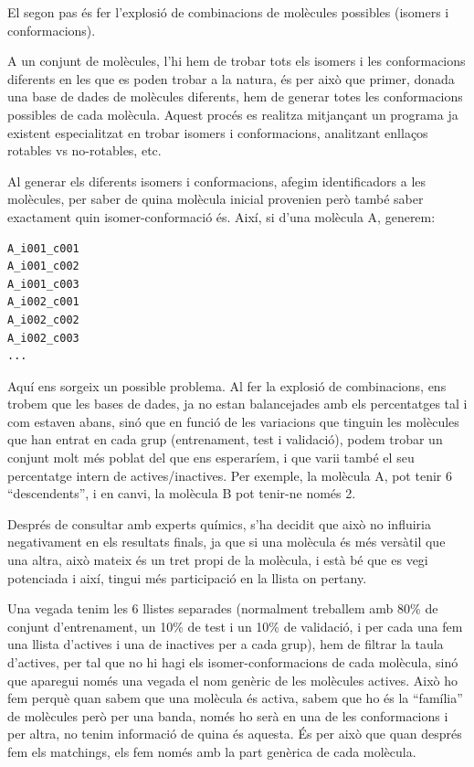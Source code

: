 
El segon pas és fer l'explosió de combinacions de molècules possibles (isomers i
conformacions).

A un conjunt de molècules, l'hi hem de trobar tots els isomers i les
conformacions diferents en les que es poden trobar a la natura, és per això que
primer, donada una base de dades de molècules diferents, hem de generar totes
les conformacions possibles de cada molècula.  Aquest procés es realitza
mitjançant un programa ja existent especialitzat en trobar isomers i conformacions,
analitzant enllaços rotables vs no-rotables, etc.

Al generar els diferents isomers i conformacions, afegim identificadors a les
molècules, per saber de quina molècula inicial provenien però també saber
exactament quin isomer-conformació és.  Així, si d'una molècula A, generem:

\begin{verbatim}
A_i001_c001
A_i001_c002
A_i001_c003
A_i002_c001
A_i002_c002
A_i002_c003
... 
\end{verbatim}


Aquí ens sorgeix un possible problema.  Al fer la explosió de combinacions, ens
trobem que les bases de dades, ja no estan balancejades amb els percentatges tal
i com estaven abans, sinó que en funció de les variacions que tinguin les
molècules que han entrat en cada grup (entrenament, test i validació), podem
trobar un conjunt molt més poblat del que ens esperaríem, i que varii també el
seu percentatge intern de actives/inactives. Per exemple, la molècula A, pot
tenir 6 ``descendents'', i en canvi, la molècula B pot tenir-ne només 2.

Després de consultar amb experts químics, s'ha decidit que això no influiria
negativament en els resultats finals, ja que si una molècula és més versàtil que
una altra, això mateix és un tret propi de la molècula, i està bé que es vegi
potenciada i així, tingui més participació en la llista on pertany.

Una vegada tenim les 6 llistes separades (normalment treballem amb 80\% de
conjunt d'entrenament, un 10\% de test i un 10\% de validació, i per cada una
fem una llista d'actives i una de inactives per a cada grup),  hem de filtrar la
taula d'actives, per tal que no hi hagi els  isomer-conformacions de cada
molècula, sinó que aparegui només una vegada el nom genèric de les molècules
actives.  Això ho fem perquè quan sabem que una molècula és activa, sabem que ho
és la ``família'' de molècules però per una banda, només ho serà en una de les
conformacions i per altra, no tenim informació de quina és aquesta.  És per això
que quan després fem els matchings, els fem només amb la part genèrica de cada
molècula.

